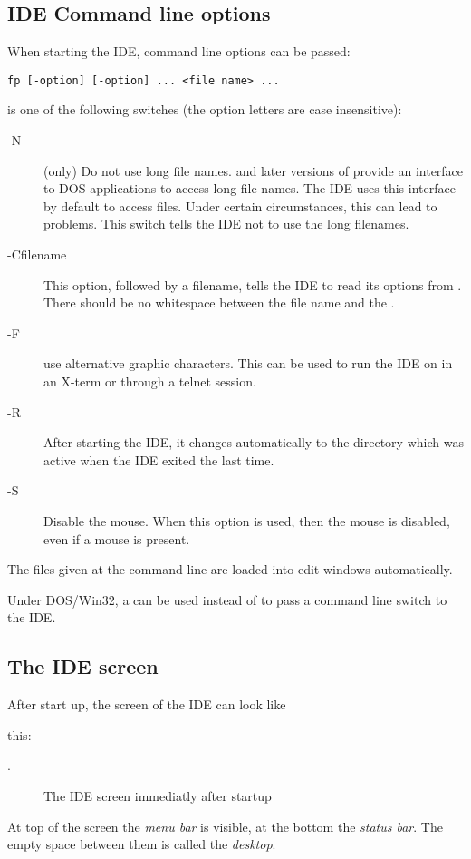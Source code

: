 \subsection{IDE Command line options}
When starting the IDE, command line options can be passed:
\begin{verbatim}
fp [-option] [-option] ... <file name> ...
\end{verbatim}
 is one of the following switches (the option letters
are case insensitive):
\begin{description}
\item [-N] (\dos only) Do not use long file names.  and later
versions of \windows provide an interface to DOS applications to access 
long file names. 
The IDE uses this interface by default to access files. Under certain 
circumstances, this can lead to problems. This switch tells the IDE not to
use the long filenames.
\item [-Cfilename] This option, followed by a filename, tells the IDE to
read its options from . There should be no whitespace between
the file name and the .
\item [-F] use alternative graphic characters. This can be used to run the
IDE on \linux in an X-term or through a telnet session.
\item [-R] After starting the IDE, it changes automatically to the directory
which was active when the IDE exited the last time.
\item [-S] Disable the mouse. When this option is used, then the mouse is
disabled, even if a mouse is present.
\end{description}
The files given at the command line are loaded into edit windows automatically.

\begin{remark}
Under DOS/Win32, a \var{/} can be used instead of \var{-} to pass a
command line switch to the IDE.
\end{remark}

\subsection{The IDE screen}

After start up, the screen of the IDE can look like 
\begin{htmlonly}
this:
\end{htmlonly}
\begin{latexonly}
.
\begin{figure}
\caption{The IDE screen immediatly after startup}
\label{fig:idestart}
\ifpdf
{}
\else
{}
\fi
\end{figure}
\end{latexonly}
At top of the screen the \emph{menu bar} is visible, at the bottom
the \emph{status bar}. The empty space between them is called the
\emph{desktop}.

